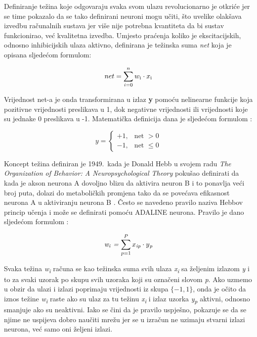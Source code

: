 \documentclass[times, utf8, zavrsni]{fer}
\begin{document}
Definiranje težina koje odgovaraju svaka svom ulazu revolucionarno je otkriće jer se time pokazalo da se tako definirani neuroni mogu učiti, što uvelike olakšava izvedbu računalnih sustava jer više nije potrebna kvantiteta da bi sustav funkcionirao, već kvalitetna izvedba. Umjesto praćenja koliko je ekscitacijskih, odnosno inhibicijskih ulaza aktivno, definirana je težinska suma \textit{net} koja je opisana sljedećom formulom:

\begin{equation}
    \label{net:eq}
    \text{$net = \sum\limits_{i=0}^n w\textsubscript{i} \cdot x\textsubscript{i}$}
\end{equation}

Vrijednost net-a je onda transformirana u izlaz \textbf{y} pomoću nelinearne funkcije koja pozitivne vrijednosti preslikava u 1, dok negativne vrijednosti ili vrijednosti koje su jednake 0 preslikava u -1. Matematička definicija dana je sljedećom formulom \citep{picton2000}:

\begin{equation}
\label{step:eq}
    y = 
    \begin{cases}
        +1, & \text{net $>0$} \\
        -1, & \text{net $\leq 0$}
    \end{cases}
\end{equation}

\bigskip

Koncept težina definiran je 1949.\ kada je Donald Hebb u svojem radu \textit{The Organization of Behavior: A Neuropsychological Theory} pokušao definirati da kada je akson neurona A dovoljno blizu da aktivira neuron B i to ponavlja veći broj puta, dolazi do metaboličkih promjena tako da se povećava efikasnost neurona A u aktiviranju neurona B \citep{hebb}. Često se navedeno pravilo naziva Hebbov princip učenja i može se definirati pomoću ADALINE neurona. Pravilo je dano sljedećom formulom \citep{picton2000}:

\begin{equation}
    \textit{w\textsubscript{i} = $\sum\limits_{p = 1}^P x\textsubscript{ip} \cdot y\textsubscript{p}$}
\end{equation}

Svaka težina \textit{w\textsubscript{i}} računa se kao težinska suma svih ulaza \textit{x\textsubscript{i}} sa željenim izlazom \textit{y} i to za svaki uzorak po skupu svih uzoraka koji su označeni slovom \textit{p}. Ako uzmemo u obzir da ulazi i izlazi poprimaju vrijednosti iz skupa $\{-1, 1\}$, onda je očito da iznos težine \textit{w\textsubscript{i}} raste ako su ulaz za tu težinu \textit{x\textsubscript{i}} i izlaz uzorka \textit{y\textsubscript{p}} aktivni, odnosno smanjuje ako su neaktivni. Iako se čini da je pravilo uspješno, pokazuje se da se njime ne uspijeva dobro naučiti mrežu jer se u izračun ne uzimaju stvarni izlazi neurona, već samo oni željeni izlazi.
\end{document}
